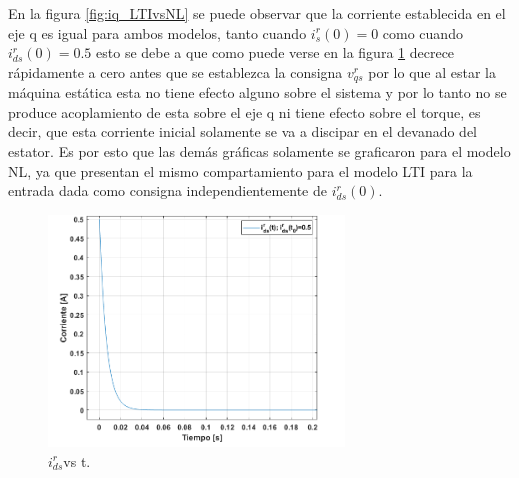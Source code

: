 \documentclass[10pt]{article}
\begin{document}
\begin{itemize}
	En la figura \ref{fig:iq_LTIvsNL} se puede observar que la corriente establecida en el eje q es igual para ambos modelos, tanto cuando $i^{r}_{s}(0)=0$ como cuando $i^{r}_{ds}(0)=0.5$ esto se debe a que como puede verse en la figura \ref{fig:ids} decrece rápidamente a cero antes que se establezca la consigna $v^{r}_{qs}$ por lo que al estar la máquina estática esta no tiene efecto alguno sobre el sistema y por lo tanto no se produce acoplamiento de esta sobre el eje q ni tiene efecto sobre el torque, es decir, que esta corriente inicial solamente se va a discipar en el devanado del estator. Es por esto que las demás gráficas solamente se graficaron para el modelo NL, ya que presentan el mismo compartamiento para el modelo LTI para la entrada dada como consigna independientemente de $i^{r}_{ds}(0)$.
		\begin{figure}[h!]
	\centering
	\includegraphics[width=0.7\textwidth]{ids.png}
	\caption{\label{fig:ids} $i^{r}_{ds}$vs t.}
	\end{figure}


\end{itemize}
\end{document}
